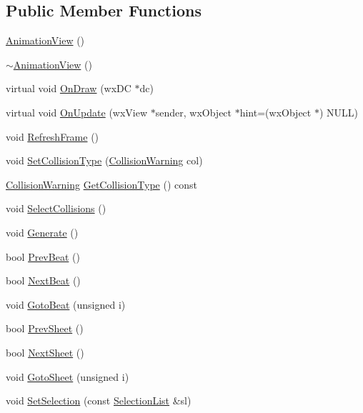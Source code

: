 \subsection*{Public Member Functions}
\begin{DoxyCompactItemize}
\item 
\hyperlink{a00015_af2c298ae67cb2c186e8737179cdba3ad}{Animation\-View} ()
\item 
\hyperlink{a00015_a323847e06af951f0cc47365477afdcf5}{$\sim$\-Animation\-View} ()
\item 
virtual void \hyperlink{a00015_a39f3d07af74a26b75ed4912b7198b1bc}{On\-Draw} (wx\-D\-C $\ast$dc)
\item 
virtual void \hyperlink{a00015_a3dc02247d57367b18dd9dcda40ad8626}{On\-Update} (wx\-View $\ast$sender, wx\-Object $\ast$hint=(wx\-Object $\ast$) N\-U\-L\-L)
\item 
void \hyperlink{a00015_ab929b54b00e41f0458e909335dbca77d}{Refresh\-Frame} ()
\item 
void \hyperlink{a00015_a3c3c70561baa29e3af60a941efd2dd76}{Set\-Collision\-Type} (\hyperlink{a00196_acf6b899fff4fd35a31a3e8884229f118}{Collision\-Warning} col)
\item 
\hyperlink{a00196_acf6b899fff4fd35a31a3e8884229f118}{Collision\-Warning} \hyperlink{a00015_a3614fac0de8823e0f22cdce02b4de27e}{Get\-Collision\-Type} () const 
\item 
void \hyperlink{a00015_ab05ce897b45b980ef1f0549267954917}{Select\-Collisions} ()
\item 
void \hyperlink{a00015_a1112f9aee2dacc91e64dbe6a63b1c5d5}{Generate} ()
\item 
bool \hyperlink{a00015_ac41a66743a4ba425ff8e7789fb168f11}{Prev\-Beat} ()
\item 
bool \hyperlink{a00015_afced9668cf5a51a0019d6775224946da}{Next\-Beat} ()
\item 
void \hyperlink{a00015_a4422666f5d79b66a31db7ff4fb2749e7}{Goto\-Beat} (unsigned i)
\item 
bool \hyperlink{a00015_a2988eb7b09958a1735fbb8383f8cd959}{Prev\-Sheet} ()
\item 
bool \hyperlink{a00015_ad808539513d97506698893ab06f6eef4}{Next\-Sheet} ()
\item 
void \hyperlink{a00015_a75cdecb5f4c40893697fd3d309eae50e}{Goto\-Sheet} (unsigned i)
\item 
void \hyperlink{a00015_a674e7715633f7e794b738ba0e2f64189}{Set\-Selection} (const \hyperlink{a00214_aaec86d4bb87e1e6f0b60e6e551c5e570}{Selection\-List} \&sl)
\item 

\end{DoxyCompactItemize}
